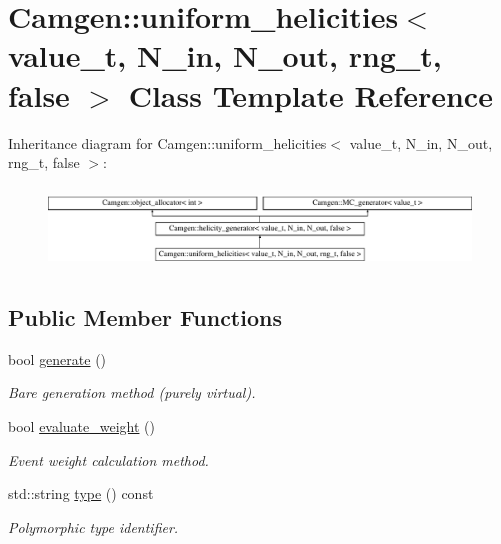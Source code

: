 \hypertarget{a00562}{}\section{Camgen\+:\+:uniform\+\_\+helicities$<$ value\+\_\+t, N\+\_\+in, N\+\_\+out, rng\+\_\+t, false $>$ Class Template Reference}
\label{a00562}
Inheritance diagram for Camgen\+:\+:uniform\+\_\+helicities$<$ value\+\_\+t, N\+\_\+in, N\+\_\+out, rng\+\_\+t, false $>$\+:\begin{figure}[H]
\begin{center}
\leavevmode
\includegraphics[height=2.176166cm]{a00562}
\end{center}
\end{figure}
\subsection*{Public Member Functions}
\begin{DoxyCompactItemize}
\item 
bool \hyperlink{a00562_a5e2b03a2b0e95a752e7f0c880f47b9e6}{generate} ()
\begin{DoxyCompactList}\small\item\em \textquotesingle{}Bare generation\textquotesingle{} method (purely virtual). \end{DoxyCompactList}\item 
\hypertarget{a00562_ac82bc82e1a2f6a0ae2eec5a8a12c0979}{}bool \hyperlink{a00562_ac82bc82e1a2f6a0ae2eec5a8a12c0979}{evaluate\+\_\+weight} ()\label{a00562_ac82bc82e1a2f6a0ae2eec5a8a12c0979}

\begin{DoxyCompactList}\small\item\em Event weight calculation method. \end{DoxyCompactList}\item 
\hypertarget{a00562_a88f74a72125079a1c17026b8d09ae7f4}{}std\+::string \hyperlink{a00562_a88f74a72125079a1c17026b8d09ae7f4}{type} () const \label{a00562_a88f74a72125079a1c17026b8d09ae7f4}

\begin{DoxyCompactList}\small\item\em Polymorphic type identifier. \end{DoxyCompactList}\end{DoxyCompactItemize}
